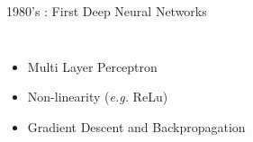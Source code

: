 \documentclass{irdbeamer}
\begin{document}
\begin{frame}[t]{1980's : First Deep Neural Networks}
\begin{columns}[t]
    \vspace{1cm}
    \begin{itemize}
        \item<1-> Multi Layer Perceptron
        \item<2-> Non-linearity (\textit{e.g.} ReLu)
        \item<3-> Gradient Descent and Backpropagation \citep{rumelhart1986learning}
    \end{itemize}
\end{columns}
\end{frame}
\end{document}
